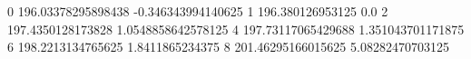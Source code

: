 0 196.03378295898438 -0.346343994140625
1 196.380126953125 0.0
2 197.4350128173828 1.0548858642578125
4 197.73117065429688 1.351043701171875
6 198.2213134765625 1.8411865234375
8 201.46295166015625 5.08282470703125
